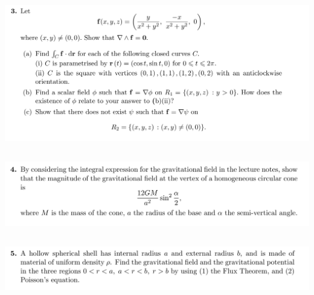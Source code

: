 \documentclass[12pt]{article}
\begin{document}
\subsection{}
\begin{mdframed}
  \includegraphics[width=400pt]{img/oxford-prelims-M5-multivariable-calc-8-3.png}
\end{mdframed}

\subsection{}
\begin{mdframed}
  \includegraphics[width=400pt]{img/oxford-prelims-M5-multivariable-calc-8-4.png}
\end{mdframed}

\subsection{}
\begin{mdframed}
  \includegraphics[width=400pt]{img/oxford-prelims-M5-multivariable-calc-8-5.png}
\end{mdframed}
\end{document}
